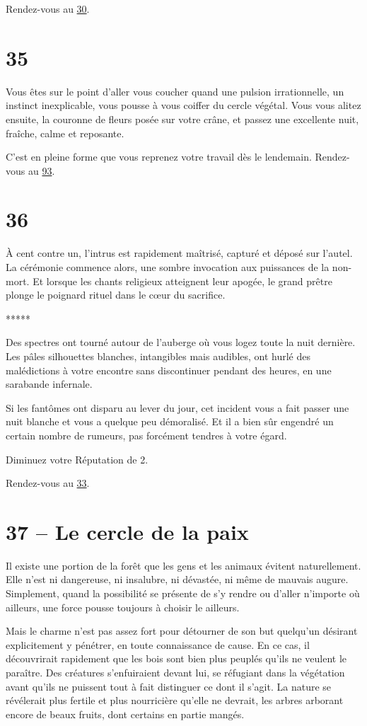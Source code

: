 \documentclass{report}
\newcommand{\gsection}[1]{
    \section{#1}
    \label{section-#1}
}
\newcommand{\glink}[1]{\hyperref[section-#1]{#1}}
\newcommand{\ellipse}{
    \begin{center}
        *****
    \end{center}
}
\begin{document}
Rendez-vous au \glink{30}.

\gsection{35}

Vous êtes sur le point d'aller vous coucher quand une pulsion irrationnelle, un instinct inexplicable, vous pousse à vous coiffer du cercle végétal. Vous vous alitez ensuite, la couronne de fleurs posée sur votre crâne, et passez une excellente nuit, fraîche, calme et reposante.

C'est en pleine forme que vous reprenez votre travail dès le lendemain. Rendez-vous au \glink{93}.

\gsection{36}

À cent contre un, l'intrus est rapidement maîtrisé, capturé et déposé sur l'autel. La cérémonie commence alors, une sombre invocation aux puissances de la non-mort. Et lorsque les chants religieux atteignent leur apogée, le grand prêtre plonge le poignard rituel dans le cœur du sacrifice.

\ellipse

Des spectres ont tourné autour de l'auberge où vous logez toute la nuit dernière. Les pâles silhouettes blanches, intangibles mais audibles, ont hurlé des malédictions à votre encontre sans discontinuer pendant des heures, en une sarabande infernale.

Si les fantômes ont disparu au lever du jour, cet incident vous a fait passer une nuit blanche et vous a quelque peu démoralisé. Et il a bien sûr engendré un certain nombre de rumeurs, pas forcément tendres à votre égard.

Diminuez votre Réputation de 2.

Rendez-vous au \glink{33}.

\gsection{37 – Le cercle de la paix}

Il existe une portion de la forêt que les gens et les animaux évitent naturellement. Elle n'est ni dangereuse, ni insalubre, ni dévastée, ni même de mauvais augure. Simplement, quand la possibilité se présente de s'y rendre ou d'aller n'importe où ailleurs, une force pousse toujours à choisir le ailleurs.

Mais le charme n'est pas assez fort pour détourner de son but quelqu'un désirant explicitement y pénétrer, en toute connaissance de cause. En ce cas, il découvrirait rapidement que les bois sont bien plus peuplés qu'ils ne veulent le paraître. Des créatures s'enfuiraient devant lui, se réfugiant dans la végétation avant qu'ils ne puissent tout à fait distinguer ce dont il s'agit. La nature se révélerait plus fertile et plus nourricière qu'elle ne devrait, les arbres arborant encore de beaux fruits, dont certains en partie mangés.
\end{document}
